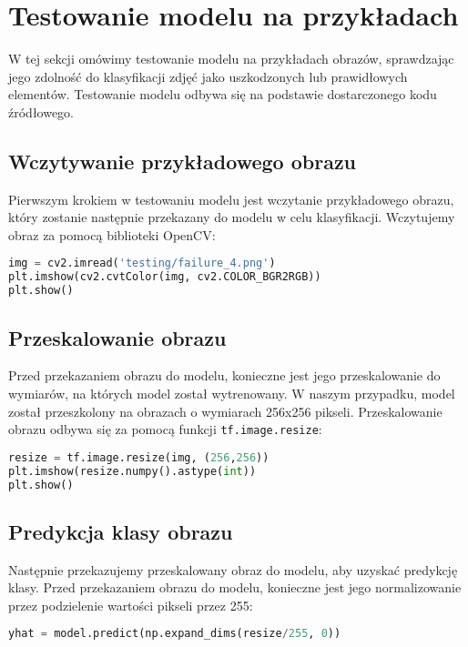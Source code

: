 \section{Testowanie modelu na przykładach}
W tej sekcji omówimy testowanie modelu na przykładach obrazów, sprawdzając jego zdolność do klasyfikacji zdjęć jako uszkodzonych lub prawidłowych elementów. Testowanie modelu odbywa się na podstawie dostarczonego kodu źródłowego.

\subsection{Wczytywanie przykładowego obrazu}
Pierwszym krokiem w testowaniu modelu jest wczytanie przykładowego obrazu, który zostanie następnie przekazany do modelu w celu klasyfikacji. Wczytujemy obraz za pomocą biblioteki OpenCV:

\begin{lstlisting}[language=Python]
img = cv2.imread('testing/failure_4.png')
plt.imshow(cv2.cvtColor(img, cv2.COLOR_BGR2RGB))
plt.show()
\end{lstlisting}

\subsection{Przeskalowanie obrazu}
Przed przekazaniem obrazu do modelu, konieczne jest jego przeskalowanie do wymiarów, na których model został wytrenowany. W naszym przypadku, model został przeszkolony na obrazach o wymiarach 256x256 pikseli. Przeskalowanie obrazu odbywa się za pomocą funkcji \texttt{tf.image.resize}:

\begin{lstlisting}[language=Python]
resize = tf.image.resize(img, (256,256))
plt.imshow(resize.numpy().astype(int))
plt.show()
\end{lstlisting}

\subsection{Predykcja klasy obrazu}
Następnie przekazujemy przeskalowany obraz do modelu, aby uzyskać predykcję klasy. Przed przekazaniem obrazu do modelu, konieczne jest jego normalizowanie przez podzielenie wartości pikseli przez 255:

\begin{lstlisting}[language=Python]
yhat = model.predict(np.expand_dims(resize/255, 0))
\end{lstlisting}

